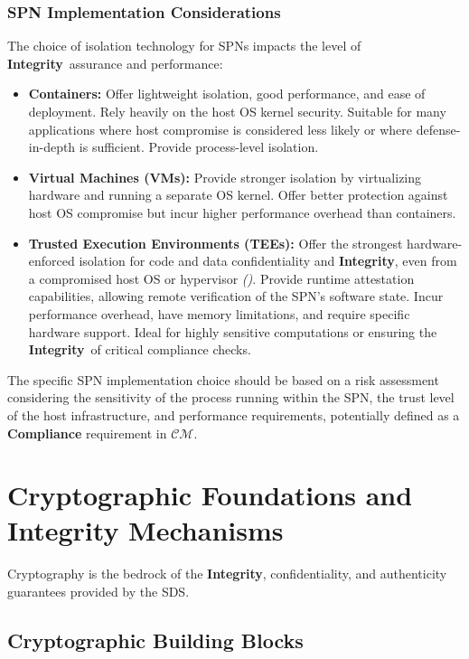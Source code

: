 \documentclass[12pt,a4paper]{report}
\renewcommand{\citep}[1]{\textit{\scriptsize{(\cite{#1})}}}
\newcommand{\Integrity}{\textbf{Integrity}}
\begin{document}
	\subsubsection{SPN Implementation Considerations} %
	\label{sec:4-2-3-2} %
	The choice of isolation technology for SPNs impacts the level of \Integrity\ assurance and performance:
	\begin{itemize}
		\item \textbf{Containers:} Offer lightweight isolation, good performance, and ease of deployment. Rely heavily on the host OS kernel security. Suitable for many applications where host compromise is considered less likely or where defense-in-depth is sufficient. Provide process-level isolation.
		\item \textbf{Virtual Machines (VMs):} Provide stronger isolation by virtualizing hardware and running a separate OS kernel. Offer better protection against host OS compromise but incur higher performance overhead than containers.
		\item \textbf{Trusted Execution Environments (TEEs):} Offer the strongest hardware-enforced isolation for code and data confidentiality and \Integrity, even from a compromised host OS or hypervisor \citep{Citadel_PlusPlus_2025}. Provide runtime attestation capabilities, allowing remote verification of the SPN's software state. Incur performance overhead, have memory limitations, and require specific hardware support. Ideal for highly sensitive computations or ensuring the \Integrity\ of critical compliance checks.
	\end{itemize}
	The specific SPN implementation choice should be based on a risk assessment considering the sensitivity of the process running within the SPN, the trust level of the host infrastructure, and performance requirements, potentially defined as a \textbf{Compliance} requirement in $\mathcal{CM}$.
	
	\section{Cryptographic Foundations and Integrity Mechanisms} %
	\label{sec:4-3} %
	
	Cryptography is the bedrock of the \Integrity, confidentiality, and authenticity guarantees provided by the SDS.
	
	\subsection{Cryptographic Building Blocks} %
	\label{sec:4-3-1} %
	
\end{document}
